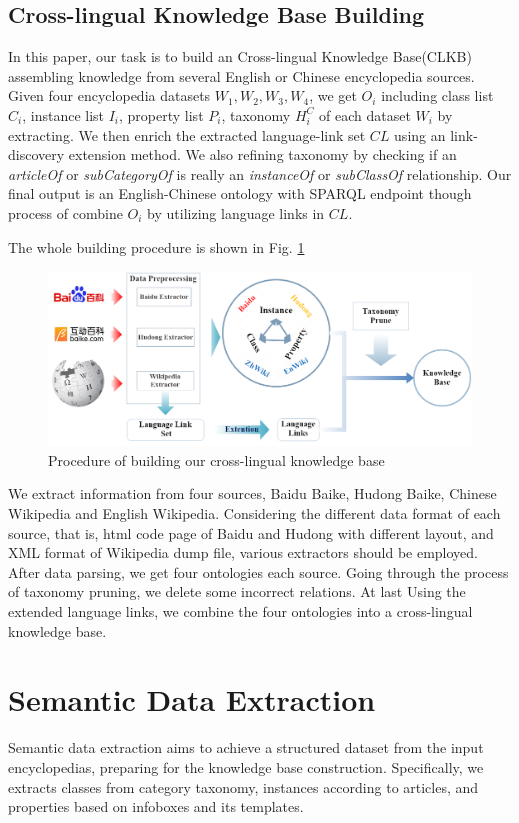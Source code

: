 \documentclass[runningheads,a4paper]{llncs}
\begin{document}
\begin{CJK*}{UTF8}{song}
\subsection{Cross-lingual Knowledge Base Building}

In this paper, our task is to build an Cross-lingual Knowledge Base(CLKB) assembling knowledge from several English or Chinese encyclopedia sources. Given four encyclopedia datasets $W_{1},W_{2},W_{3},W_{4}$, we get $O_{i}$ including class list $C_{i}$, instance list $I_{i}$, property list $P_{i}$, taxonomy $H^C_{i}$ of each dataset $W_{i}$ by extracting. We then enrich the extracted language-link set $CL$ using an link-discovery extension method. We also refining taxonomy by checking if an \textit{articleOf} or \textit{subCategoryOf} is really an \textit{instanceOf} or \textit{subClassOf} relationship. Our final output is an English-Chinese ontology  with SPARQL endpoint though process of combine $O_{i}$ by utilizing language links in $CL$.

The whole building procedure is shown in Fig. \ref{fig:procedure}
\begin{figure}[ht]
    \centerline{\includegraphics[width=1\columnwidth]{fig/procedure2}}
    \caption{Procedure of building our cross-lingual knowledge base}
    \label{fig:procedure}
\end{figure}%
We extract information from four sources, Baidu Baike, Hudong Baike, Chinese Wikipedia and English Wikipedia. Considering the different data format of each source, that is, html code page of Baidu and Hudong with different layout, and XML format of Wikipedia dump file, various extractors should be employed. After data parsing, we get four ontologies each source. Going through the process of taxonomy pruning, we delete some incorrect relations. At last Using the extended language links, we combine the four ontologies into a cross-lingual knowledge base.

\section{Semantic Data Extraction}
\label{sec:dp}
Semantic data extraction aims to achieve a structured dataset from the input encyclopedias, preparing for the knowledge base construction. Specifically, we extracts classes from category taxonomy, instances according to articles, and properties based on infoboxes and its templates.


\end{CJK*}
\end{document}
